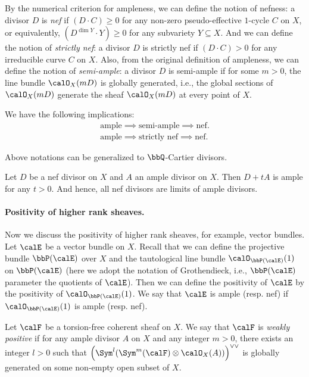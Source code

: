 By the numerical criterion for ampleness, we can define the notion of nefness: a divisor $D$ is \emph{nef} if $(D\cdot C)\ge 0$ for any non-zero pseudo-effective $1$-cycle $C$ on $X$,
or equivalently, $(D^{\dim Y}\cdot Y)\ge 0$ for any subvariety $Y\subseteq X$.
And we can define the notion of \emph{strictly nef}: a divisor $D$ is strictly nef if $(D\cdot C)>0$ for any irreducible curve $C$ on $X$.
Also, from the original definition of ampleness, we can define the notion of \emph{semi-ample}:
a divisor $D$ is semi-ample if for some $m>0$, the line bundle $\calO_X(mD)$ is globally generated,
i.e., the global sections of $\calO_X(mD)$ generate the sheaf $\calO_X(mD)$ at every point of $X$.

\begin{remark}
	We have the following implications:
	\begin{align*}
		\text{ample}\implies \text{semi-ample}\implies \text{nef}. \\
		\text{ample}\implies \text{strictly nef}\implies \text{nef}.
	\end{align*}
\end{remark}
\begin{remark}
	Above notations can be generalized to $\bbQ$-Cartier divisors.
\end{remark}
\begin{remark}
	Let $D$ be a nef divisor on $X$ and $A$ an ample divisor on $X$.
	Then $D+tA$ is ample for any $t>0$.
	And hence, all nef divisors are limits of ample divisors.
\end{remark}

\paragraph{Positivity of higher rank sheaves.}
Now we discuss the positivity of higher rank sheaves, for example, vector bundles.
Let $\calE$ be a vector bundle on $X$.
Recall that we can define the projective bundle $\bbP(\calE)$ over $X$ and the tautological line bundle $\calO_{\bbP(\calE)}(1)$ on $\bbP(\calE)$
(here we adopt the notation of Grothendieck, i.e., $\bbP(\calE)$ parameter the quotients of $\calE$).
Then we can define the positivity of $\calE$ by the positivity of $\calO_{\bbP(\calE)}(1)$.
We say that $\calE$ is ample (resp. nef) if $\calO_{\bbP(\calE)}(1)$ is ample (resp. nef).

\begin{definition}
	Let $\calF$ be a torsion-free coherent sheaf on $X$.
	We say that $\calF$ is \emph{weakly positive} if for any ample divisor $A$ on $X$ and any integer $m>0$, there exists an integer $l>0$ such that $\left(\Sym^{l}(\Sym^{m}(\calF)\otimes \calO_X(A))\right)^{\vee\vee}$ is globally generated on some non-empty open subset of $X$.
\end{definition}

